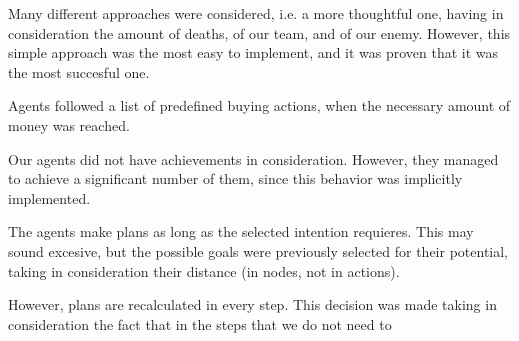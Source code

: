 \documentclass{llncs2e/llncs}
\begin{document}
    Many different approaches were considered, i.e. a more thoughtful one, having 
    in consideration the amount of deaths, of our team, and of our enemy. However,
    this simple approach was the most easy to implement, and it was proven that it
    was the most succesful one.

    Agents followed a list of predefined buying actions, when the necessary amount 
    of money was reached.

    Our agents did not have achievements in consideration. However, they managed 
    to achieve a significant number of them, since this behavior was implicitly 
    implemented.

    The agents make plans as long as the selected intention requieres. This may 
    sound excesive, but the possible goals were previously selected for their 
    potential, taking in consideration their distance (in nodes, not in actions).

    However, plans are recalculated in every step. This decision was made taking 
    in consideration the fact that in the steps that we do not need to 

\begin{comment}
    
PREGUNTAS {
1. What is the main strategy of your team?
2. How does the overall team work together? (coordination, information 
sharing, ...)
3. How do your agents analyze the topology of the map? And how do they exploit 
their findings?
4. How do your agents communicate with the server?
5. How do you implement the roles of the agents? Which strategies do the 
different roles implement?
6. How do you find good zones? How do you estimate the value of zones?
7. How do you conquer zones? How do you defend zones if attacked? Do you 
attack zones?
8. Can your agents change their behavior during runtime? If so, what triggers 
the changes?
9. What algorithm(s) do you use for agent path planning?
10. How do you make use of the buying-mechanism?
11. How important are achievements for your overall strategy?
12. Do your agents have an explicit mental state?
13. How do your agents communicate? And what do they communicate?
14. How do you organize your agents? Do you use e.g. hierarchies? Is your 
organization implicit or explicit?
15. Is most of your agents’ behavior emergent on and individual and team level?
16. If your agents perform some planning, how many steps do they plan ahead?

}

\end{comment}
\end{document}
